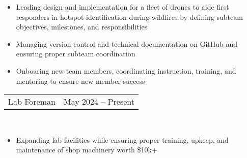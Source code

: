 \documentclass[18pt]{article}
\begin{document}
\vspace{-0.5\baselineskip}
\begin{itemize}[noitemsep]
    \vspace{-\baselineskip}
        
    \item Leading design and implementation for a fleet of drones to aide first responders in hotspot identification during wildfires by defining subteam objectives, milestones, and responsibilities
    \item Managing version control and technical documentation on GitHub and ensuring proper subteam coordination
    \item Onboaring new team members, coordinating instruction, training, and mentoring to ensure new member success
\end{itemize}

\vspace{-0.5\baselineskip}

\begin{tabular}{p{} p{}}
    Lab Foreman &
    \hfill May 2024 – Present
\end{tabular}\\

\vspace{-0.5\baselineskip}
\begin{itemize}[noitemsep]
    \vspace{-\baselineskip}
    \item Expanding lab facilities while ensuring proper training, upkeep, and maintenance of shop machinery worth \$10k+
\end{itemize}



\vspace{-0.5\baselineskip}
\end{document}
